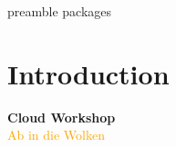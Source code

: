 \RequirePackage{import}
{preamble}
{packages}


    \section{Introduction}\label{sec:introduction}

    \begin{frame}[c]
        \centering
        \Huge
        \textbf{Cloud Workshop}
        \\
        \vspace{1ex}
        \Large
        \textcolor{orange}{Ab in die Wolken}
    \end{frame}


